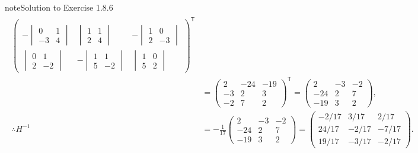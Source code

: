 \documentclass[letterpaper,10pt,english]{jupyterBook}
\begin{document}
\begin{sphinxadmonition}{note}{Solution to Exercise 1.8.6}
\begin{equation*}
\begin{split}
\begin{align*}
\begin{pmatrix}
        \\
        - \begin{vmatrix} 0 & 1 \\ -3 & 4 \end{vmatrix}
        &
          \begin{vmatrix} 1 & 1 \\ 2 & 4 \end{vmatrix}
        &
        - \begin{vmatrix} 1 & 0 \\ 2 & -3 \end{vmatrix}
        \\
          \begin{vmatrix} 0 & 1 \\ 2 & -2 \end{vmatrix}
        &
        - \begin{vmatrix} 1 & 1 \\ 5 & -2 \end{vmatrix}
        &
          \begin{vmatrix} 1 & 0 \\ 5 & 2 \end{vmatrix}
    \end{pmatrix}^\mathsf{T} \\
    &=
    \begin{pmatrix}
        2 & -24 & -19 \\
        -3 & 2 & 3 \\
        -2 & 7 & 2 
    \end{pmatrix}^\mathsf{T}
    =
    \begin{pmatrix}
         2  & -3 & -2 \\
        -24 &  2 &  7 \\
        -19 &  3 &  2 
    \end{pmatrix}, \\
    \therefore H^{-1}
    &= -\frac{1}{17}
    \begin{pmatrix}
         2  & -3 & -2 \\
        -24 &  2 &  7 \\
        -19 &  3 &  2 
    \end{pmatrix}
    =
    \begin{pmatrix}
        -2/17 &  3/17 &  2/17 \\
        24/17 & -2/17 & -7/17 \\
        19/17 & -3/17 & -2/17
    \end{pmatrix} .
\end{align*} \end{split}

\end{equation*}
\end{sphinxadmonition}
\end{document}
